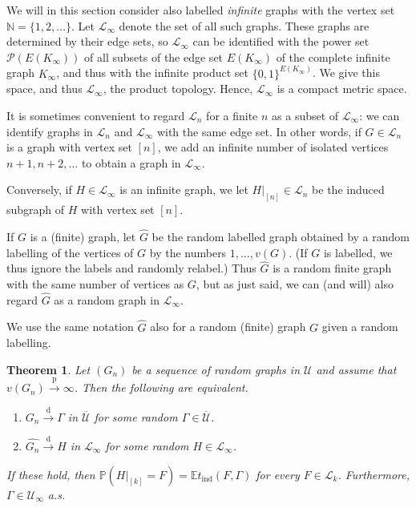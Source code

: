 \documentclass[11pt,reqno,tbtags]{amsart}
\numberwithin{equation}{section}
\newtheorem{theorem}{Theorem}[section]
\theoremstyle{definition}
\theoremstyle{remark}
\newenvironment{romenumerate}{\begin{enumerate}%
 \renewcommand{\labelenumi}{\textup{(\roman{enumi})}}%
 \renewcommand{\theenumi}{\textup{(\roman{enumi})}}%
 }{\end{enumerate}}
\newcommand\set[1]{\ensuremath{\{#1\}}}
\newcommand\xpar[1]{(#1)}
\newcommand{\tend}{\longrightarrow}
\newcommand\dto{\overset{\mathrm{d}}{\tend}}
\newcommand\pto{\overset{\mathrm{p}}{\tend}}
\newcommand\bbN{\mathbb N}
\newcommand\E{\operatorname{\mathbb E{}}}
\renewcommand\P{\operatorname{\mathbb P{}}}
\newcommand\gG{\Gamma}
\newcommand\cL{{\mathcal L}}
\newcommand\cP{\mathcal P}
\newcommand\cU{{\mathcal U}}
\renewcommand{\=}{:=}
\newcommand{\tind}{t_{\mathrm{ind}}}
\newcommand{\cuq}{\overline{\cU}}
\newcommand{\cuoo}{\cU_\infty}
\newcommand{\cloo}{\cL_\infty}
\newcommand{\Koo}{K_\infty}
\newcommand\hG{\widehat G}
\newcommand\hgn{\widehat {G_n}}
\newcommand{\rest}[1]{|_{[#1]}}
\begin{document}
We will in this section consider also labelled \emph{infinite} graphs
with the vertex set $\bbN=\set{1,2,\dots}$.
Let $\cloo$ denote the set of all such graphs. These graphs are
determined by their edge sets, so $\cloo$ can be identified with the power
set $\cP(E(\Koo))$
of all subsets of the edge set $E(\Koo)$ of the complete infinite
graph $\Koo$, and thus with the infinite product set $\set{0,1}^{E(\Koo)}$.
We give this space, and thus $\cloo$, the product topology. Hence,
$\cloo$ is a compact metric space.

It is sometimes convenient to regard $\cL_n$ for a finite $n$ as a
subset of $\cloo$: we can identify graphs in $\cL_n$ and $\cloo$ with
the same edge set. In other words, if $G\in\cL_n$ is a graph with
vertex set $[n]$, we add an infinite number of isolated vertices
$n+1,n+2,\dots$ to obtain a graph in $\cloo$.

Conversely, if $H\in\cloo$ is an infinite graph, we let $H\rest
n\in\cL_n$ be the induced subgraph of $H$ with vertex set $[n]$.

If $G$ is a (finite) graph, let $\hG$ be the random labelled graph
obtained by a random labelling of the vertices of $G$ by the numbers
$1,\dots,v(G)$.
(If $G$ is labelled, we thus ignore the labels and randomly relabel.)
Thus $\hG$ is a random finite graph with the same number of vertices
as $G$, but  as just said, we can (and will) also regard $\hG$ as a
random graph in $\cloo$.

We use the same notation $\hG$ also for a random (finite) graph $G$
given a random labelling.

\begin{theorem}\label{TC1}
  Let $(G_n)$ be a sequence of random graphs in $\cU$ and assume that
  $v(G_n)\pto\infty$. Then the following are equivalent.
  \begin{romenumerate}
\item
$G_n\dto \gG$ in $\cuq$ for some random $\gG\in\cuq$.	
\item
$\hgn\dto H$ in $\cloo$ for some random $H\in\cloo$.	
  \end{romenumerate}
If these hold, then
$\P\xpar{H\rest k =F} = \E \tind(F,\gG)$ for every $F\in\cL_k$.
Furthermore, $\gG\in\cuoo$ a.s.
\end{theorem}
\end{document}
